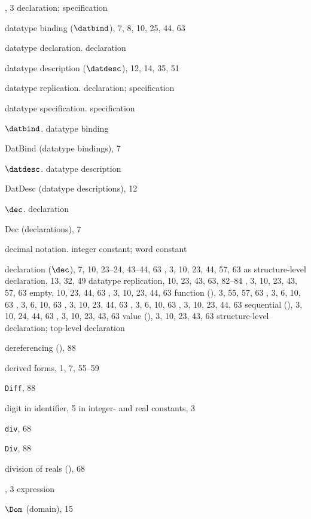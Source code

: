 \begin{theindex}
\item \DATATYPE, 3
\subitem \seealso declaration; specification
\item datatype binding ($\datbind$), 7, 8, 10, 25, 44, 63
\item datatype declaration. \see declaration
\item datatype description ($\datdesc$), 12, 14, 35, 51
\item datatype replication. \see declaration; specification
\item datatype specification. \see specification
\item $\datbind$. \see datatype binding
\item DatBind (datatype bindings), 7
\item $\datdesc$. \see datatype description
\item DatDesc (datatype descriptions), 12
\item $\dec$. \see declaration
\item Dec (declarations), 7
\item decimal notation. \see integer constant; word constant
\item declaration ($\dec$), 7, 10, 23--24, 43--44, 63
\subitem {}, 3, 10, 23, 44, 57, 63
\subitem as structure-level declaration, 13, 32, 49
\subitem datatype replication, 10, 23, 43, 63, 82--84
\subitem {}, 3, 10, 23, 43, 57, 63
\subitem empty, 10, 23, 44, 63
\subitem {}, 3, 10, 23, 44, 63
\subitem function (), 3, 55, 57, 63
\subitem {}, 3, 6, 10, 63
\subitem {}, 3, 6, 10, 63
\subitem {}, 3, 10, 23, 44, 63
\subitem {}, 3, 6, 10, 63
\subitem {}, 3, 10, 23, 44, 63
\subitem sequential (\boxml{;}), 3, 10, 24, 44, 63
\subitem {}, 3, 10, 23, 43, 63
\subitem value (), 3, 10, 23, 43, 63
\subitem \seealso structure-level declaration; top-level declaration
\item dereferencing (\ml{!}), 88
\item derived forms, 1, 7, 55--59
\item {\tt Diff}, 88
\item digit 
\subitem in identifier, 5
\subitem in integer- and real constants, 3
\item {\tt div}, 68
\item {\tt Div}, 88
\item division of reals (\ml{/}), 68
\item \DO, 3
\subitem \seealso expression
\item $\Dom$ (domain), 15

\end{theindex}
